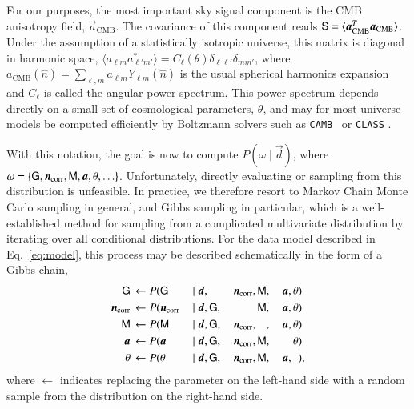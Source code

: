 \documentclass[twocolumn]{aa}
\def\camb{\texttt{CAMB}}
\renewcommand{\d}[0]{\vec{d}}
\newcommand{\n}[0]{\vec{n}}
\renewcommand{\a}[0]{\vec{a}}
\newcommand{\M}[0]{\tens{M}}
\renewcommand{\S}[0]{\tens{S}}
\newcommand{\data}{\vec d}
\newcommand{\ncorr}{\vec n_\mathrm{corr}}
\begin{document}
For our purposes, the most important sky signal component is the CMB anisotropy field, $\a_{\mathrm{CMB}}$. The covariance of this component reads $\S = \langle \a_{\mathrm{CMB}}^T \a_{\mathrm{CMB}}\rangle$. Under the assumption of a statistically isotropic universe, this matrix is diagonal in harmonic space, $\langle a_{\ell m} a^*_{\ell' m'}\rangle = C_{\ell}(\theta) \delta_{\ell\ell'}\delta_{mm'}$, where $a_{\mathrm{CMB}}(\hat{n}) = \sum_{\ell,m} a_{\ell m} Y_{\ell m}(\hat{n})$ is the usual spherical harmonics expansion and $C_{\ell}$ is called the angular power spectrum. This power spectrum depends directly on a small set of cosmological parameters, $\theta$, and may for most universe models be computed efficiently by Boltzmann solvers such as \camb\ \citep{Lewis:1999bs} or \texttt{CLASS} \citep{lesgourgues:2011}.

With this notation, the goal is now to compute $P(\omega\mid\d)$, where $\omega = \{\tens{G}, \n_{\mathrm{corr}}, \M, \a, \theta, \ldots\}$. Unfortunately, directly evaluating or sampling from this distribution is unfeasible. In practice, we therefore resort to Markov Chain Monte Carlo sampling in general, and Gibbs sampling in particular, which is a well-established method for sampling from a complicated multivariate distribution by iterating over all conditional distributions. For the data model described in Eq.~\eqref{eq:model}, this process may be described schematically in the form of a Gibbs chain, 
  \begin{alignat}{9}
    \label{eq:gain_samp_dist}\tens{G} &\,\leftarrow          P(\tens{G}&\,               \mid \data, &\,\phantom{\tens{G},} &\,\ncorr,&\,\M, &\,\a, &\,\theta)\\
    \label{eq:ncorr_samp_dist} \ncorr &\,\leftarrow    P(\ncorr&\,        \mid \data, &\,\tens{G}, &\,\phantom{\ncorr,}  &\,\M, &\,\a, &\,\theta)\\
    \label{eq:beta_samp}\M &\,\leftarrow                     P(\M &\, \mid \data, &\,\tens{G}, &\,\ncorr, &\,\phantom{\M}, &\,\a, &\,\theta)\\
    \a &\,\leftarrow                                   P(\a&\,            \mid \data, &\,\tens{G}, &\,\ncorr, &\,\M, &\,\phantom{\a,} &\,\theta)\\
    \theta &\,\leftarrow                             P(\theta &\,         \mid \data, &\,\tens{G}, &\,\ncorr, &\,\M, &\,\a,&\,\phantom{\theta})\label{eq:param_samp},
    \end{alignat}
  where $\leftarrow$ indicates replacing the parameter on the left-hand side with a random sample from the distribution on the right-hand side.
\end{document}
